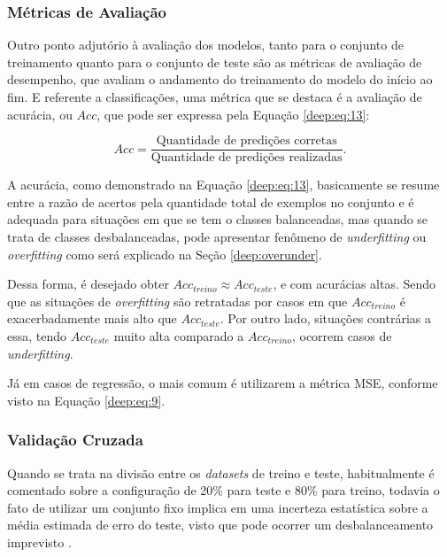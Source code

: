\subsubsection{Métricas de Avaliação}
\label{deep:metrics}

Outro ponto adjutório à avaliação dos modelos, tanto para o conjunto de treinamento quanto para o conjunto de teste são as métricas de avaliação de desempenho, que avaliam o andamento do treinamento do modelo do início ao fim. E referente a classificações, uma métrica que se destaca é a avaliação de acurácia, ou $Acc$, que pode ser expressa pela Equação \ref{deep:eq:13}:

\begin{equation}
    \label{deep:eq:13}
    Acc = \frac{\text{Quantidade de predições corretas}}{\text{Quantidade de predições realizadas}}.
\end{equation}

A acurácia, como demonstrado na Equação \ref{deep:eq:13}, basicamente se resume entre a razão de acertos pela quantidade total de exemplos no conjunto e é adequada para situações em que se tem o classes balanceadas, mas quando se trata de classes desbalanceadas, pode apresentar fenômeno de \textit{underfitting} ou \textit{overfitting} como será explicado na Seção \ref{deep:overunder}.

Dessa forma, é desejado obter $Acc_{treino} \approx Acc_{teste}$, e com  acurácias altas. Sendo que as situações de \textit{overfitting} são retratadas por casos em que $Acc_{treino}$ é exacerbadamente mais alto que $Acc_{teste}$. Por outro lado, situações contrárias a essa, tendo $Acc_{teste}$ muito alta comparado a $Acc_{treino}$, ocorrem casos de \textit{underfitting}.

Já em casos de regressão, o mais comum é utilizarem a métrica MSE, conforme visto na Equação \ref{deep:eq:9}.


\subsubsection{Validação Cruzada}
\label{deep:cross}

Quando se trata na divisão entre os \textit{datasets} de treino e teste, habitualmente é comentado sobre a configuração de 20\% para teste e 80\% para treino, todavia o fato de utilizar um conjunto fixo implica em uma incerteza estatística sobre a média estimada de erro do teste, visto que pode ocorrer um desbalanceamento imprevisto \cite{Goodfellow2016}.

